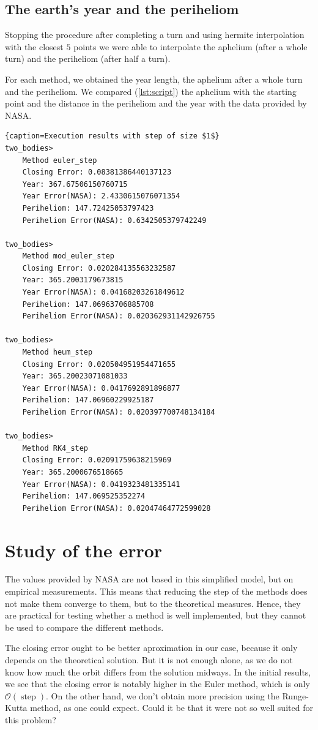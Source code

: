 \documentclass[12pt, onside]{article}
\begin{document}
\subsection{The earth's year and the periheliom}

    Stopping the procedure after completing a turn and
using hermite interpolation with the closest $5$ points
we were able to interpolate the aphelium (after a whole turn)
and the periheliom (after half a turn).

    For each method, we obtained
the year length, the aphelium after a whole turn and the periheliom.
We compared (\cref{lst:script}) the aphelium with the starting point and
the distance in the periheliom and the year with the data provided by NASA.

\begin{lstlisting}{caption=Execution results with step of size $1$}
two_bodies> 
	Method euler_step
	Closing Error: 0.08381386440137123
	Year: 367.67506150760715
	Year Error(NASA): 2.4330615076071354
	Periheliom: 147.72425053797423
	Periheliom Error(NASA): 0.6342505379742249

two_bodies> 
	Method mod_euler_step
	Closing Error: 0.020284135563232587
	Year: 365.2003179673815
	Year Error(NASA): 0.04168203261849612
	Periheliom: 147.06963706885708
	Periheliom Error(NASA): 0.020362931142926755

two_bodies> 
	Method heum_step
	Closing Error: 0.020504951954471655
	Year: 365.20023071081033
	Year Error(NASA): 0.0417692891896877
	Periheliom: 147.06960229925187
	Periheliom Error(NASA): 0.020397700748134184

two_bodies> 
	Method RK4_step
	Closing Error: 0.02091759638215969
	Year: 365.2000676518665
	Year Error(NASA): 0.0419323481335141
	Periheliom: 147.069525352274
	Periheliom Error(NASA): 0.02047464772599028
\end{lstlisting}

\section{Study of the error}

    The values provided by NASA are not based in this simplified model,
but on empirical measurements.
This means that reducing the step of the methods does not make them converge to them,
but to the theoretical measures.
Hence, they are practical for testing whether a method is well implemented,
but they cannot be used to compare the different methods.

    The closing error ought to be better aproximation in our case,
because it only depends on the theoretical solution.
But it is not enough alone,
as we do not know how much the orbit differs from the solution midways.
In the initial results, we see that
the closing error is notably higher in the Euler method, which is only
$\mathcal{O}(\operatorname{step})$.
On the other hand, we don't obtain more precision using the Runge-Kutta method,
as one could expect.
Could it be that it were not so well suited for this problem?
\end{document}
